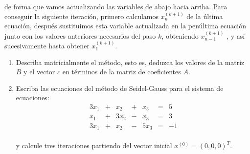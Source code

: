 \documentclass[12pt]{article}
\begin{document}
\begin{ejercicio} 
     de forma que vamos actualizando las variables de abajo hacia arriba. Para conseguir la siguiente iteración, primero calculamos $x_n^{(k+1)}$ de la última ecuación, después sustituimos esta variable actualizada en la penúltima ecuación junto con los valores anteriores necesarios del paso $k$, obteniendo $x^{(k+1)}_{n-1}$ , y así sucesivamente hasta obtener $x_1^{(k+1)}.$

     \begin{enumerate}
         \item Describa matricialmente el método, esto es, deduzca los valores de la matriz $B$ y el vector $c$ en términos de la matriz de coeficientes $A$.

         \item Escriba las ecuaciones del método de Seidel-Gauss para el sistema de ecuaciones:
         \begin{equation*}\begin{array}{rrrrrrr}
            3x_1 & + & x_2 & + &x_3 & = & 5 \\
            x_1 & + & 3x_2 & - &x_3 & = & 3 \\
            3x_1 & + & x_2 & -& 5x_3 & = & -1 \\
         \end{array}
         \end{equation*}

         y calcule tres iteraciones partiendo del vector inicial $x^{(0)} = (0, 0, 0)^T $.

        \begin{comment}
         \begin{equation*}
             \left.
             \begin{array}{l}
                x_1^{(k+1)} = \frac{1}{3}\left( 5-x_2^{(k+1)}-x_3^{(k+1)}\right)\\
                x_2^{(k+1)} = \frac{1}{3}\left( 3+x_3^{(k+1)}-x_1^{(k)}\right)\\
                x_3^{(k+1)} = -\frac{1}{5}\left( -1-x_2^{(k)}-3x_1^{(k)}\right)\\
            \end{array} \right\}
         \end{equation*}


\end{comment}
\end{enumerate}
\end{ejercicio}
\end{document}
